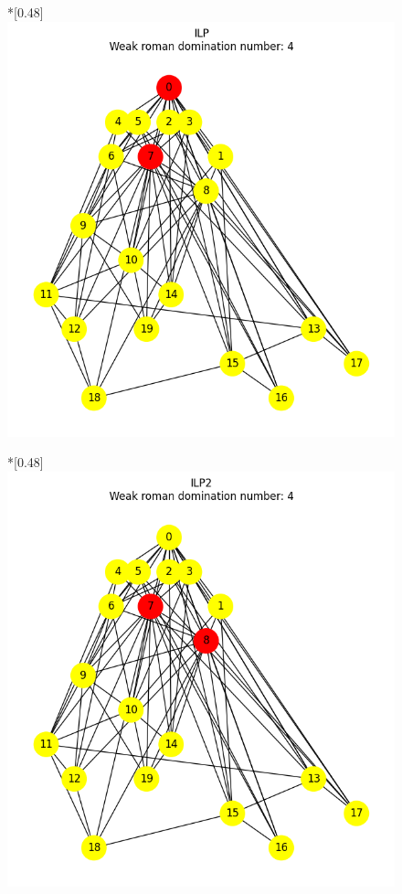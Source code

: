     \begin{figure}[htbp]
        \centering
        \begin{subcaptionbox}*{}[0.48\linewidth]
            {\includegraphics[width=0.75\linewidth]{assets/plots/ILP/ScaleFree_n20_i2_results.png}}
        \end{subcaptionbox}
        \hfill
        \begin{subcaptionbox}*{}[0.48\linewidth]
            {\includegraphics[width=0.75\linewidth]{assets/plots/ILP2/ScaleFree_n20_i2_results.png}}
        \end{subcaptionbox}
        \hfill

\end{figure}
